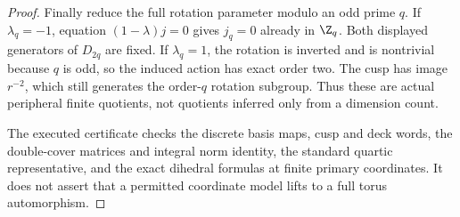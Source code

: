 \begin{proof}
Finally reduce the full rotation parameter modulo an
odd prime $q$. If $\lambda_q=-1$, equation
$(1-\lambda)j=0$ gives $j_q=0$ already in $\Z_q$.
Both displayed generators of $D_{2q}$ are fixed.
If $\lambda_q=1$, the rotation is inverted and is
nontrivial because $q$ is odd, so the induced action
has exact order two. The cusp has image $r^{-2}$,
which still generates the order-$q$ rotation subgroup.
Thus these are actual peripheral finite quotients,
not quotients inferred only from a dimension count.

The executed certificate
checks the discrete basis maps, cusp and deck words,
the double-cover matrices and integral norm identity,
the standard quartic representative, and the exact
dihedral formulas at finite primary coordinates.
It does not assert that a permitted coordinate
model lifts to a full torus automorphism.
\end{proof}
